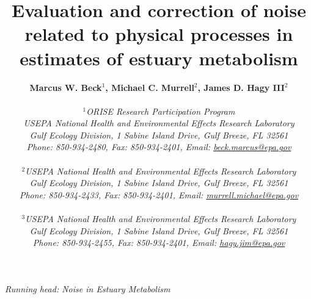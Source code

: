 \begin{singlespace}
\title{{\bf {\Large Evaluation and correction of noise related to physical processes in estimates of estuary metabolism}}}
\author{
  {\bf {\normalsize Marcus W. Beck$^1$, Michael C. Murrell$^2$, James D. Hagy III$^2$}}
  \\\\{\textit {\normalsize $^1$ORISE Research Participation Program}}
  \\{\textit {\normalsize USEPA National Health and Environmental Effects Research Laboratory}}
	\\{\textit {\normalsize Gulf Ecology Division, 1 Sabine Island Drive, Gulf Breeze, FL 32561}}
	\\{\textit {\normalsize Phone: 850-934-2480, Fax: 850-934-2401, Email: \href{mailto:beck.marcus@epa.gov}{beck.marcus@epa.gov}}}
  \\\\{\textit {\normalsize $^2$USEPA National Health and Environmental Effects Research Laboratory}}
	\\{\textit {\normalsize Gulf Ecology Division, 1 Sabine Island Drive, Gulf Breeze, FL 32561}}
	\\{\textit {\normalsize Phone: 850-934-2433, Fax: 850-934-2401, Email: \href{mailto:murrell.michael@epa.gov}{murrell.michael@epa.gov}}}
  \\\\{\textit {\normalsize $^3$USEPA National Health and Environmental Effects Research Laboratory}}
	\\{\textit {\normalsize Gulf Ecology Division, 1 Sabine Island Drive, Gulf Breeze, FL 32561}}
	\\{\textit {\normalsize Phone: 850-934-2455, Fax: 850-934-2401, Email: \href{mailto:hagy.jim@epa.gov}{hagy.jim@epa.gov}}}
	}
\date{}
\maketitle
\vfill{\centerline{\textit {\normalsize Running head: Noise in Estuary Metabolism}}}
\end{singlespace}
\clearpage